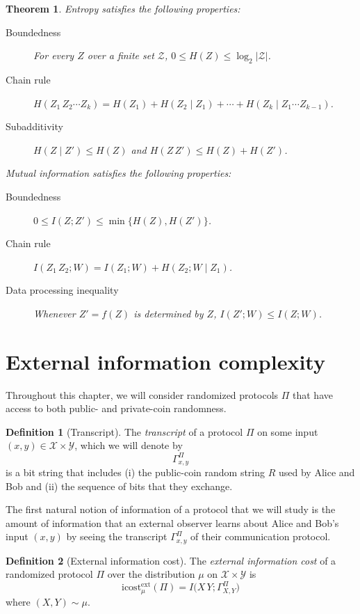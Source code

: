\documentclass[11pt]{amsart}
\theoremstyle{plain}
\newtheorem{theorem}{Theorem}
\theoremstyle{definition}
\newtheorem{definition}{Definition}
\theoremstyle{plain}
\newcommand{\calX}{\mathcal{X}}
\newcommand{\calY}{\mathcal{Y}}
\newcommand{\calZ}{\mathcal{Z}}
\newcommand{\icostext}{\mathrm{icost}^{\mathrm{ext}}}
\begin{document}
\begin{theorem}
Entropy satisfies the following properties:
\begin{description}
\item[Boundedness] For every $Z$ over a finite set $\calZ$, $0 \le H(Z) \le \log_2 |\calZ|$.
\item[Chain rule] $H(Z_1\,Z_2\cdots Z_k) = H(Z_1) + H(Z_2 \mid Z_1) + \cdots + H(Z_k \mid Z_1\cdots Z_{k-1})$.
\item[Subadditivity] $H(Z \mid Z') \le H(Z)$ and $H(Z\,Z') \le H(Z) + H(Z')$.
\end{description}
Mutual information satisfies the following properties:
\begin{description}
\item[Boundedness] $0 \le I(Z ; Z') \le \min\{ H(Z), H(Z') \}$.
\item[Chain rule] $I(Z_1\,Z_2 ; W) = I(Z_1 ; W) + H(Z_2 ; W \mid Z_1)$.
\item[Data processing inequality] Whenever $Z' = f(Z)$ is determined by $Z$, $I(Z' ; W) \le I(Z ; W)$.
\end{description}

\end{theorem}



\newpage 
\section{External information complexity}

Throughout this chapter, we will consider randomized protocols $\Pi$ that have access to both public- and private-coin randomness. 

\begin{definition}[Transcript]
The \emph{transcript} of a protocol $\Pi$ on some input $(x,y) \in \calX \times \calY$, which we will denote by
\[
\Gamma_{x,y}^\Pi
\]
is a bit string that includes (i) the public-coin random string $R$ used by Alice and Bob and (ii) the sequence of bits that they exchange. 
\end{definition}

The first natural notion of information of a protocol that we will study is the amount of information that an external observer learns about Alice and Bob's input $(x,y)$ by seeing the transcript $\Gamma_{x,y}^\Pi$ of their communication protocol.

\begin{definition}[External information cost]
The \emph{external information cost} of a randomized protocol $\Pi$ over the distribution $\mu$ on $\calX \times \calY$ is
\[
\icostext_\mu(\Pi) = I\big( X\,Y ; \Gamma_{X,Y}^\Pi \big)
\]
where $(X,Y) \sim \mu$.
\end{definition}
\end{document}
